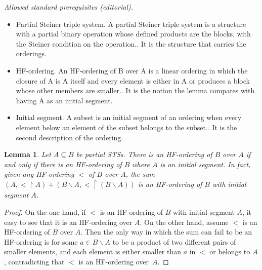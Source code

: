 \documentclass[10pt,a4paper]{article}
\theoremstyle{note}
\newtheorem{lemma}[thm]{Lemma}
\begin{document}
\noindent\textit{Allowed standard prerequisites (editorial).}\begin{itemize}
\item Partial Steiner triple system. A partial Steiner triple system is a structure with a partial binary operation whose defined products are the blocks, with the Steiner condition on the operation.. It is the structure that carries the orderings.
\item HF-ordering. An HF-ordering of B over A is a linear ordering in which the closure of A is A itself and every element is either in A or produces a block whose other members are smaller.. It is the notion the lemma compares with having A as an initial segment.
\item Initial segment. A subset is an initial segment of an ordering when every element below an element of the subset belongs to the subset.. It is the second description of the ordering.
\end{itemize}\medskip
\begin{lemma}\label{order-over}
	Let $A\subseteq B$ be partial STSs. There is an HF-ordering of $B$ over $A$ if and only if there is an HF-ordering of $B$ where $A$ is an initial segment. In fact, given any HF-ordering $<$ of $B$ over $A$, the sum $(A,<\restriction A)+(B\smallsetminus A, <\restriction (B\smallsetminus A))$ is an HF-ordering of $B$ with initial segment $A$.
\end{lemma}	

\begin{proof}
	On the one hand, if $<$ is an HF-ordering of $B$ with initial segment $A$, it easy to see that it is an HF-ordering over $A$. On the other hand, assume $<$ is an HF-ordering of $B$ over $A$. Then the only way in which the sum can fail to be an HF-ordering is for some $a\in B \smallsetminus A$ to be a product of two different pairs of smaller elements, %
and each element is either smaller than $a$ in $<$ or belongs to $A$, contradicting that $<$ is an HF-ordering over~$A$.
\end{proof}
\end{document}
